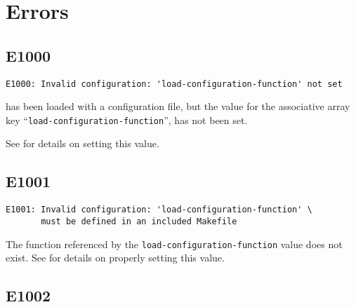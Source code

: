 %
%
%
%
\chapter{Errors}

\newcommand{\lmsbwerror}[1]{\section{#1}\label{errors:#1}}

\lmsbwerror{E1000}

\begin{footnotesize}
\begin{verbatim}
E1000: Invalid configuration: 'load-configuration-function' not set
\end{verbatim}
\end{footnotesize}

\lmsbw has been loaded with a configuration file, but the value for
the associative array key ``\texttt{load-configuration-function}'',
has not been set.

See  for details on
setting this value.

\lmsbwerror{E1001}

\begin{footnotesize}
\begin{verbatim}
E1001: Invalid configuration: 'load-configuration-function' \
       must be defined in an included Makefile
\end{verbatim}
\end{footnotesize}

The function referenced by the \texttt{load-configuration-function}
value does not exist.  See
 for details on properly
setting this value.

\lmsbwerror{E1002}

